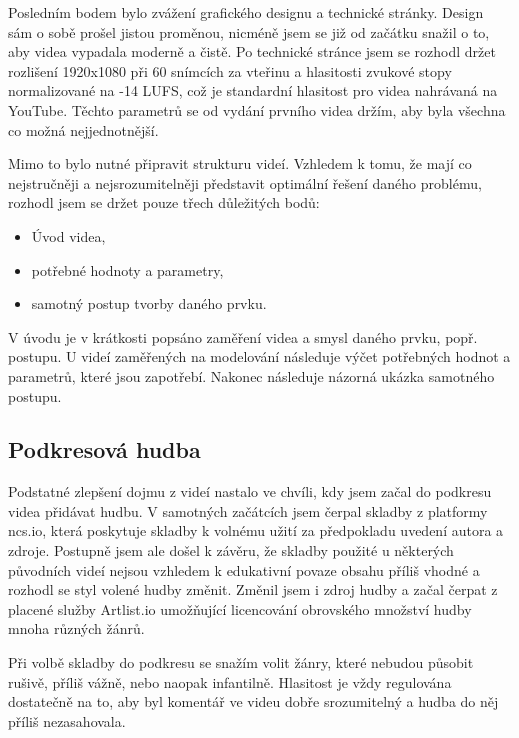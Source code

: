 Posledním bodem bylo zvážení grafického designu a technické stránky.
Design sám o sobě prošel jistou proměnou, nicméně jsem se již od začátku snažil o to, aby videa vypadala moderně a čistě.
Po technické stránce jsem se rozhodl držet rozlišení 1920x1080 při 60 snímcích za vteřinu a hlasitosti zvukové stopy normalizované na -14 LUFS, což je standardní hlasitost pro videa nahrávaná na YouTube.
Těchto parametrů se od vydání prvního videa držím, aby byla všechna co možná nejjednotnější.

Mimo to bylo nutné připravit strukturu videí.
Vzhledem k tomu, že mají co nejstručněji a nejsrozumitelněji představit optimální řešení daného problému, rozhodl jsem se držet pouze třech důležitých bodů:
\begin{itemize}[topsep=0pt]
    \setlength\itemsep{0em}
    \item Úvod videa,
    \item potřebné hodnoty a parametry,
    \item samotný postup tvorby daného prvku.
\end{itemize}
V úvodu je v krátkosti popsáno zaměření videa a smysl daného prvku, popř. postupu.
U videí zaměřených na modelování následuje výčet potřebných hodnot a parametrů, které jsou zapotřebí.
Nakonec následuje názorná ukázka samotného postupu.

\subsection{Podkresová hudba}
Podstatné zlepšení dojmu z videí nastalo ve chvíli, kdy jsem začal do podkresu videa přidávat hudbu.
V samotných začátcích jsem čerpal skladby z platformy ncs.io, která poskytuje skladby k volnému užití za předpokladu uvedení autora a zdroje.
Postupně jsem ale došel k závěru, že skladby použité u některých původních videí nejsou vzhledem k edukativní povaze obsahu příliš vhodné a rozhodl se styl volené hudby změnit. 
Změnil jsem i zdroj hudby a začal čerpat z placené služby Artlist.io umožňující licencování obrovského množství hudby mnoha různých žánrů.

Při volbě skladby do podkresu se snažím volit žánry, které nebudou působit rušivě, příliš vážně, nebo naopak infantilně.
Hlasitost je vždy regulována dostatečně na to, aby byl komentář ve videu dobře srozumitelný a hudba do něj příliš nezasahovala.

